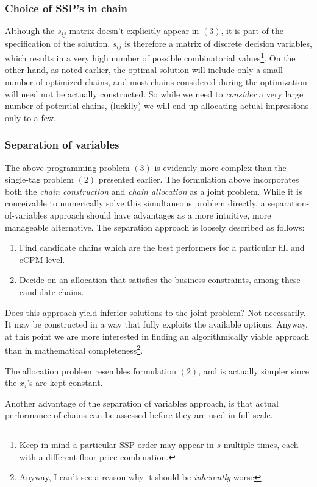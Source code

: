 \documentclass{article}
\begin{document}
\begin{large}
\subsubsection{Choice of SSP's in chain}
Although the $s_{ij}$ matrix doesn't explicitly appear in $(3)$, it is part of the specification of the solution. $s_{ij}$ is therefore a matrix of discrete decision variables, which results in a very high number of possible combinatorial values\footnote{Keep in mind a particular SSP order may appear in $s$ multiple times, each with a different floor price combination.}. On the other hand, as noted earlier, the optimal solution will include only a small number of optimized chains, and most chains considered during the optimization will need not be actually constructed. So while we need to \emph{consider} a very large number of potential chains, (luckily) we will end up allocating actual impressions only to a few.

\subsubsection{Separation of variables}
The above programming problem $(3)$ is evidently more complex than the single-tag problem $(2)$ presented earlier. The formulation above incorporates both the \emph{chain construction} and \emph{chain allocation} as a joint problem. While it is conceivable to numerically solve this simultaneous problem directly, a separation-of-variables approach should have advantages as a more intuitive, more manageable alternative. The separation approach is loosely described as follows:
\begin{enumerate}
\item Find candidate chains which are the best performers for a particular fill and eCPM level.
\item Decide on an allocation that satisfies the business constraints, among these candidate chains.
\end{enumerate}
Does this approach yield inferior solutions to the joint problem? Not necessarily. It may be constructed in a way that fully exploits the available options. Anyway, at this point we are more interested in finding an algorithmically viable approach than in mathematical completeness\footnote{Anyway, I can't see a reason why it should be \emph{inherently} worse}.

The allocation problem resembles formulation $(2)$, and is actually simpler since the $x_i$'s are kept constant.

Another advantage of the separation of variables approach, is that actual performance of chains can be assessed before they are used in full scale.


\end{large}
\end{document}
